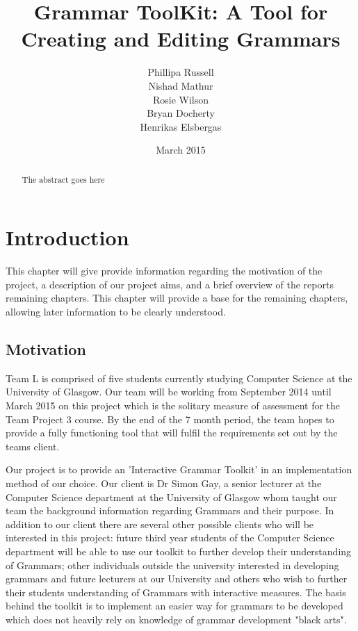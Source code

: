 \documentclass{l3proj}
\begin{document}
\title{Grammar ToolKit: A Tool for Creating and Editing Grammars}
\author{Phillipa Russell \\
        Nishad Mathur \\
        Rosie Wilson \\
        Bryan Docherty \\
        Henrikas Elsbergas}
        
\date{ March 2015}
\maketitle
\begin{abstract}

The abstract goes here

\end{abstract}
\educationalconsent
\tableofcontents
\chapter{Introduction}
This chapter will give provide information regarding the motivation of the project, a description of our project aims, and a brief overview of the reports remaining chapters. This chapter will provide a base for the remaining chapters, allowing later information to be clearly understood.

\label{intro}

\section{Motivation}
Team L is comprised of five students currently studying Computer Science at the University of Glasgow. Our team will be working from September 2014 until March 2015 on this project which is the solitary measure of assessment for the Team Project 3 course. By the end of the 7 month period, the team hopes to provide a fully functioning tool that will fulfil the requirements set out by the teams client. 

Our project is to provide an 'Interactive Grammar Toolkit' in an implementation method of our choice. Our client is Dr Simon Gay, a senior lecturer at the Computer Science department at the University of Glasgow whom taught our team the background information regarding Grammars and their purpose. In addition to our client there are several other possible clients who will be interested in this project: future third year students of the Computer Science department will be able to use our toolkit to further develop their understanding of Grammars; other individuals outside the university interested in developing grammars and future lecturers at our University and others who wish to further their students understanding of Grammars with interactive measures.  The basis behind the toolkit is to implement an easier way for grammars to be developed which does not heavily rely on knowledge of grammar development "black arts".
\end{document}
